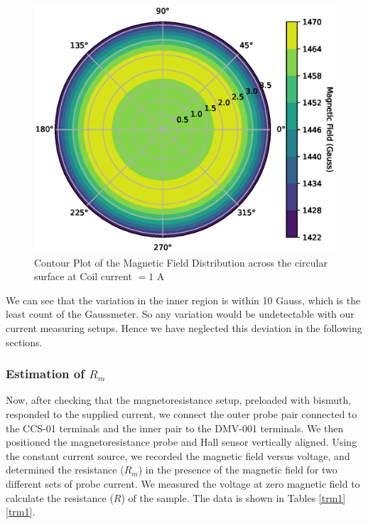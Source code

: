\begin{figure}
    \centering
    \includegraphics[width=1\columnwidth]{images/contour1.eps}
    \caption{Contour Plot of the Magnetic Field Distribution across the circular surface at Coil current $= 1$ A}
    \label{g2}
\end{figure}

We can see that the variation in the inner region is within 10 Gauss, which is the least count of the Gaussmeter. So any variation would be undetectable with our current measuring setups. Hence we have neglected this deviation in the following sections.

\subsubsection*{Estimation of $R_m$}
Now, after checking that the magnetoresistance setup, preloaded with bismuth, responded to the supplied current, we connect the  outer probe pair connected to the CCS-01 terminals and the inner
pair to the DMV-001 terminals.
We then positioned the magnetoresistance probe and Hall sensor vertically aligned. Using the constant current source, we recorded the magnetic field versus voltage, and determined the resistance ($R_m$) in the presence of the magnetic field for two different sets of probe current. We measured the voltage at zero magnetic field to calculate the resistance ($R$) of the sample. The data
is shown in Tables \ref{trm1} \ref{trm1}.



